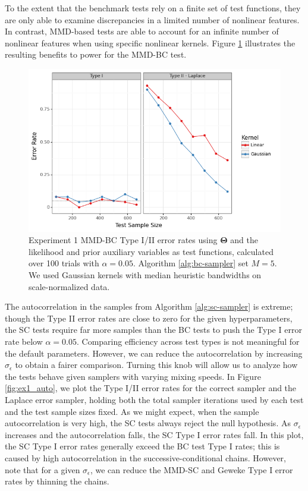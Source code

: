 \documentclass[a4paper,12pt]{article}
\begin{document}
To the extent that the benchmark tests rely on a finite set of test functions, they are only able to examine discrepancies in a limited number of nonlinear features. In contrast, MMD-based tests are able to account for an infinite number of nonlinear features when using specific nonlinear kernels. Figure \ref{fig:ex1_kernel} illustrates the resulting benefits to power for the MMD-BC test. 
\begin{figure}
    \centering
    \includegraphics[width=\textwidth]{figures/gandy_scott_kernel.png}
    \caption{Experiment 1 MMD-BC Type I/II error rates using $\mathbf{\Theta}$ and the likelihood and prior auxiliary variables as test functions, calculated over 100 trials with $\alpha=0.05$. Algorithm \ref{alg:bc-sampler} set $M=5$. We used Gaussian kernels with median heuristic bandwidths on scale-normalized data.}
    \label{fig:ex1_kernel}
\end{figure}

The autocorrelation in the samples from Algorithm \ref{alg:sc-sampler} is extreme; though the Type II error rates are close to zero for the given hyperparameters, the SC tests require far more samples than the BC tests to push the Type I error rate below $\alpha=0.05$. Comparing efficiency across test types is not meaningful for the default parameters. However, we can reduce the autocorrelation by increasing $\sigma_{\epsilon}$ to obtain a fairer comparison. Turning this knob will allow us to analyze how the tests behave given samplers with varying mixing speeds. 
In Figure \ref{fig:ex1_auto}, we plot the Type I/II error rates for the correct sampler and the Laplace error sampler, holding both the total sampler iterations used by each test and the test sample sizes fixed. As we might expect, when the sample autocorrelation is very high, the SC tests always reject the null hypothesis. As $\sigma_{\epsilon}$ increases and the autocorrelation falls, the SC Type I error rates fall. In this plot, the SC Type I error rates generally exceed the BC test Type I rates; this is caused by high autocorrelation in the successive-conditional chains. However, note that for a given $\sigma_{\epsilon}$, we can reduce the MMD-SC and Geweke Type I error rates by thinning the chains.
\end{document}
